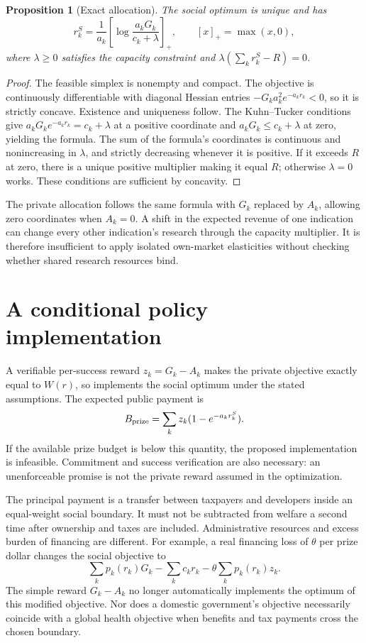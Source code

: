 \documentclass[11pt]{article}
\newtheorem{proposition}{Proposition}
\begin{document}
\begin{proposition}[Exact allocation]
The social optimum is unique and has
\[
 r_k^S=\frac1{a_k}\left[\log\frac{a_kG_k}{c_k+\lambda}\right]_+,
 \qquad [x]_+=\max(x,0),
\]
where $\lambda\geq0$ satisfies the capacity constraint and
$\lambda(\sum_kr_k^S-R)=0$.
\end{proposition}
\begin{proof}
The feasible simplex is nonempty and compact. The objective is continuously differentiable with diagonal Hessian entries $-G_ka_k^2e^{-a_kr_k}<0$, so it is strictly concave. Existence and uniqueness follow. The Kuhn--Tucker conditions give $a_kG_ke^{-a_kr_k}=c_k+\lambda$ at a positive coordinate and $a_kG_k\leq c_k+\lambda$ at zero, yielding the formula. The sum of the formula's coordinates is continuous and nonincreasing in $\lambda$, and strictly decreasing whenever it is positive. If it exceeds $R$ at zero, there is a unique positive multiplier making it equal $R$; otherwise $\lambda=0$ works. These conditions are sufficient by concavity.
\end{proof}

The private allocation follows the same formula with $G_k$ replaced by $A_k$, allowing zero coordinates when $A_k=0$. A shift in the expected revenue of one indication can change every other indication's research through the capacity multiplier. It is therefore insufficient to apply isolated own-market elasticities without checking whether shared research resources bind.

\section*{A conditional policy implementation}
A verifiable per-success reward $z_k=G_k-A_k$ makes the private objective exactly equal to $W(r)$, so implements the social optimum under the stated assumptions. The expected public payment is
\[
 B_{\rm prize}=\sum_kz_k(1-e^{-a_kr_k^S}).
\]
If the available prize budget is below this quantity, the proposed implementation is infeasible. Commitment and success verification are also necessary: an unenforceable promise is not the private reward assumed in the optimization.

The principal payment is a transfer between taxpayers and developers inside an equal-weight social boundary. It must not be subtracted from welfare a second time after ownership and taxes are included. Administrative resources and excess burden of financing are different. For example, a real financing loss of $\theta$ per prize dollar changes the social objective to
\[
 \sum_kp_k(r_k)G_k-\sum_kc_kr_k
       -\theta\sum_kp_k(r_k)z_k.
\]
The simple reward $G_k-A_k$ no longer automatically implements the optimum of this modified objective. Nor does a domestic government's objective necessarily coincide with a global health objective when benefits and tax payments cross the chosen boundary.
\end{document}
